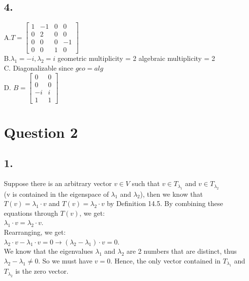 \documentclass{article}
\begin{document}
\subsection*{4.}
A.$T = \begin{bmatrix}
1 & -1 & 0 & 0\\
0 & 2 & 0 & 0\\
0 & 0 & 0 & -1\\
0 & 0 & 1 & 0
\end{bmatrix}$
\\B.$\lambda_1 = -i, \lambda_2 = i$  geometric multiplicity = 2 algebraic multiplicity = 2
\\C. Diagonalizable since $geo = alg$
\\D. $B = \begin{bmatrix}
0 & 0 \\
0 & 0 \\
-i & i \\
1 & 1
\end{bmatrix}$
\pagebreak
\section*{Question 2}
\subsection*{1.}
Suppose there is an arbitrary vector $v \in V$ such that $v \in T_{\lambda_1}$ and $v \in T_{\lambda_2}$ 
\\(v is contained in the eigenspace of $\lambda_1$ and $\lambda_2$), then we know that \\ $T(v) = \lambda_1 \cdot v$ and $T(v) = \lambda_2 \cdot v$ by Definition 14.5. By combining these equations through $T(v)$, we get:
\\$\lambda_1 \cdot v = \lambda_2 \cdot v$. 
\\Rearranging, we get:
\\$\lambda_2 \cdot v - \lambda_1 \cdot v = 0 \rightarrow (\lambda_2 - \lambda_1) \cdot v = 0$. 
\\We know that the eigenvalues $\lambda_1$ and $\lambda_2$ are 2 numbers that are distinct, thus $\lambda_2 - \lambda_1 \neq 0$. So we must have $v = 0$. Hence, the only vector contained in $T_{\lambda_1}$ and $T_{\lambda_2}$ is the zero vector.
\end{document}
